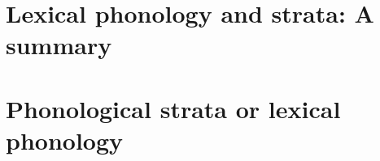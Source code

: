 
\chapter{Lexical phonology and strata: A summary}
\chapter{Phonological strata or lexical phonology}